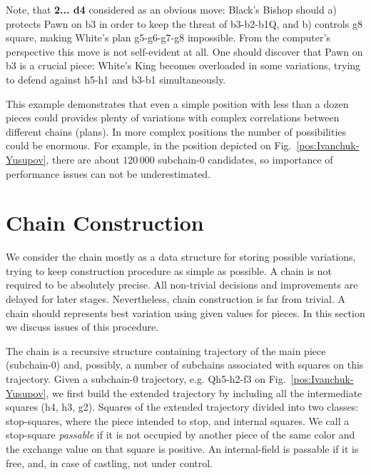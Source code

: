\documentclass{llncs}
\begin{document}
Note, that {\bf 2... d4} considered as an obvious move: Black's Bishop
should a) protects Pawn on b3 in order to keep the threat of
b3-b2-b1Q, and b) controls g8 square, making White's plan g5-g6-g7-g8
impossible. From the computer's perspective this move is not
self-evident at all. One should discover that Pawn on b3 is a crucial
piece: White's King becomes overloaded in some variations, trying to
defend against h5-h1 and b3-b1 simultaneously.

This example demonstrates that even a simple position with less than a
dozen pieces could provides plenty of variations with complex
correlations between different chains (plans). In more complex
positions the number of possibilities could be enormous. For example,
in the position depicted on Fig.~\ref{pos:Ivanchuk-Yusupov}, there are
about $120\,000$ subchain-0 candidates, so importance of performance
issues can not be underestimated.

\section{Chain Construction}
We consider the chain mostly as a data structure for storing possible
variations, trying to keep construction procedure as simple as
possible. A chain is not required to be absolutely precise. All
non-trivial decisions and improvements are delayed for later
stages. Nevertheless, chain construction is far from trivial. A chain
should represents best variation using given values for pieces. In
this section we discuss issues of this procedure.

The chain is a recursive structure containing trajectory of the main
piece (subchain-0) and, possibly, a number of subchains associated
with squares on this trajectory. Given a subchain-0 trajectory,
e.g. Qh5-h2-f3 on Fig.~\ref{pos:Ivanchuk-Yusupov}, we first build the
extended trajectory by including all the intermediate squares (h4, h3,
g2). Squares of the extended trajectory divided into two classes:
stop-squares, where the piece intended to stop, and internal
squares. We call a stop-square \emph{passable} if it is not occupied
by another piece of the same color and the exchange value on that
square is positive. An internal-field is passable if it is free, and,
in case of castling, not under control.
\end{document}

